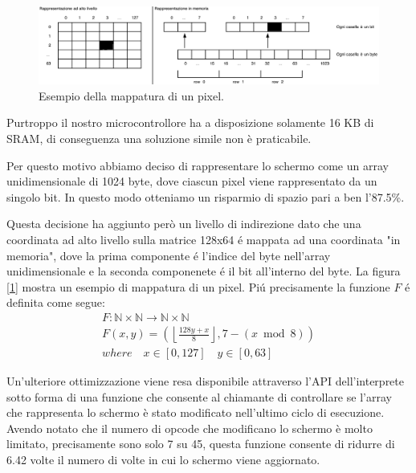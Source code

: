 \documentclass[a4paper]{article}
\begin{document}
\begin{figure}[h!t]
    \begin{center}
        \includegraphics[scale=0.38]{figures/screenopt_small.pdf}
    \end{center}
    \caption{Esempio della mappatura di un pixel.}
    \label{fig:screenopt}
\end{figure}

Purtroppo il nostro microcontrollore ha a disposizione solamente 16 KB di SRAM, di conseguenza una soluzione simile non è praticabile.

Per questo motivo abbiamo deciso di rappresentare lo schermo come un array unidimensionale di 1024 byte, dove ciascun pixel viene rappresentato da un singolo bit. In questo modo otteniamo un risparmio di spazio pari a ben l'87.5\%.

Questa decisione ha aggiunto però un livello di indirezione dato che una coordinata ad alto livello sulla matrice 128x64 é mappata ad una coordinata "in memoria", dove la prima componente é l'indice del byte nell'array unidimensionale e la seconda componenete é il bit all'interno del byte. La figura [\ref{fig:screenopt}] mostra un esempio di mappatura di un pixel. Piú precisamente la funzione $F$ é definita come segue:
\begin{gather*}
    F: \mathbb{N} \times \mathbb{N} \rightarrow \mathbb{N} \times \mathbb{N} \\
    F(x, y) = \left(\left\lfloor \frac{128y + x}{8} \right\rfloor, 7 - (x \bmod 8)\right) \\
    where \quad x \in [0, 127] \quad y \in [0, 63]
\end{gather*}

Un'ulteriore ottimizzazione viene resa disponibile attraverso l'API dell'interprete sotto forma di una funzione che consente al chiamante di controllare se l'array che rappresenta lo schermo è stato modificato nell'ultimo ciclo di esecuzione. Avendo notato che il numero di opcode che modificano lo schermo è molto limitato, precisamente sono solo 7 su 45, questa funzione consente di ridurre di 6.42 volte il numero di volte in cui
lo schermo viene aggiornato.
\end{document}
